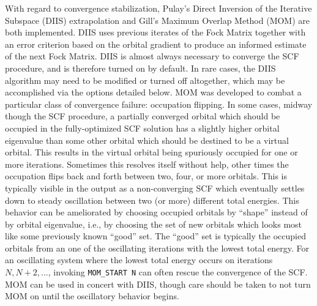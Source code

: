 With regard to convergence stabilization, Pulay's
Direct Inversion of the Iterative Subspace (DIIS) extrapolation and Gill's
Maximum Overlap Method (MOM) are both implemented. DIIS uses previous iterates
of the Fock Matrix together with an error criterion based on the orbital
gradient to produce an informed estimate of the next Fock Matrix. DIIS is almost
always necessary to converge the SCF procedure, and is therefore turned on by
default. In rare cases, the DIIS algorithm may need to be modified or turned off
altogether, which may be accomplished via the options detailed below. MOM was
developed to combat a particular class of convergence failure: occupation
flipping. In some cases, midway though the SCF procedure, a partially converged
orbital which should be occupied in the fully-optimized SCF solution has a
slightly higher orbital eigenvalue than some other orbital which should be
destined to be a virtual orbital. This results in the virtual orbital being
spuriously occupied for one or more iterations. Sometimes this resolves itself
without help, other times the occupation flips back and forth between two, four,
or more orbitals. This is typically visible in the output as a non-converging
SCF which eventually settles down to steady oscillation between two (or more)
different total energies. This behavior can be ameliorated by choosing occupied
orbitals by ``shape'' instead of by orbital eigenvalue, i.e., by choosing the
set of new orbitals which looks most like some previously known ``good'' set.
The ``good'' set is typically the occupied orbitals from an one of the
oscillating iterations with the lowest total energy. For an oscillating system
where the lowest total energy occurs on iterations $N,N+2,\ldots$, invoking
\texttt{MOM\_START N} can often rescue the convergence of the SCF. MOM can be
used in concert with DIIS, though care should be taken to not turn MOM on until
the oscillatory behavior begins. 

%

